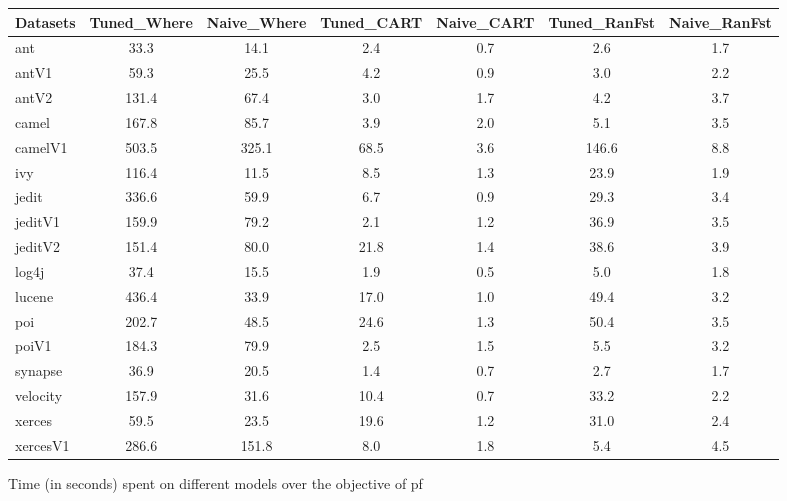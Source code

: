 \documentclass{sig-alternative}
\begin{document}
\begin{figure}[!ht]
\scriptsize
\centering
  \begin{tabular}{l|c |c |c |c |c |c }
    \hline\hline
    Datasets & Tuned\_Where & Naive\_Where & Tuned\_CART & Naive\_CART & Tuned\_RanFst & Naive\_RanFst\\
    \hline
    ant & 33.3 & 14.1 & 2.4 & 0.7 & 2.6 & 1.7\\
    antV1 & 59.3 & 25.5 & 4.2 & 0.9 & 3.0 & 2.2\\
    antV2 & 131.4 & 67.4 & 3.0 & 1.7 & 4.2 & 3.7\\
    camel & 167.8 & 85.7 & 3.9 & 2.0 & 5.1 & 3.5\\
    camelV1 & 503.5 & 325.1 & 68.5 & 3.6 & 146.6 & 8.8\\
    ivy & 116.4 & 11.5 & 8.5 & 1.3 & 23.9 & 1.9\\
    jedit & 336.6 & 59.9 & 6.7 & 0.9 & 29.3 & 3.4\\
    jeditV1 & 159.9 & 79.2 & 2.1 & 1.2 & 36.9 & 3.5\\
    jeditV2 & 151.4 & 80.0 & 21.8 & 1.4 & 38.6 & 3.9\\
    log4j & 37.4 & 15.5 & 1.9 & 0.5 & 5.0 & 1.8\\
    lucene & 436.4 & 33.9 & 17.0 & 1.0 & 49.4 & 3.2\\
    poi & 202.7 & 48.5 & 24.6 & 1.3 & 50.4 & 3.5\\
    poiV1 & 184.3 & 79.9 & 2.5 & 1.5 & 5.5 & 3.2\\
    synapse & 36.9 & 20.5 & 1.4 & 0.7 & 2.7 & 1.7\\
    velocity & 157.9 & 31.6 & 10.4 & 0.7 & 33.2 & 2.2\\
    xerces & 59.5 & 23.5 & 19.6 & 1.2 & 31.0 & 2.4\\
    xercesV1 & 286.6 & 151.8 & 8.0 & 1.8 & 5.4 & 4.5\\
  \end{tabular}
  \caption{Time (in seconds) spent on different models over the objective of pf}
\end{figure}
\end{document}

